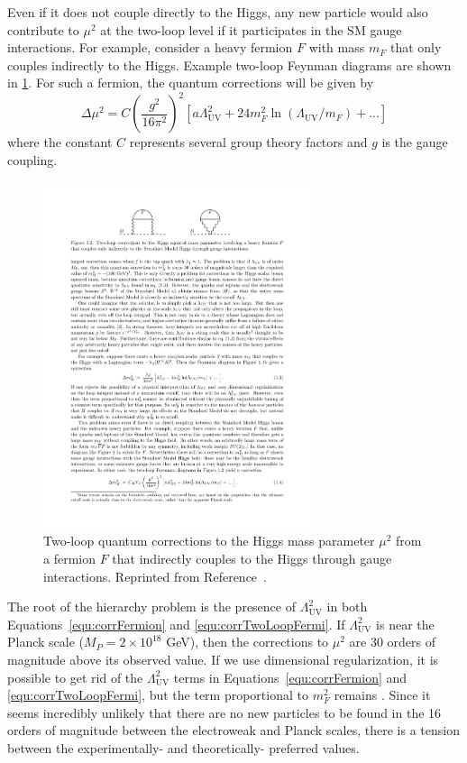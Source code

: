 Even if it does not couple directly to the Higgs, any new particle would also contribute to $\mu^2$ at the two-loop level if it participates in the SM gauge interactions. For example, consider a heavy fermion $F$ with mass $m_F$ that only couples indirectly to the Higgs. Example two-loop Feynman diagrams are shown in 
\ref{fig:hierarchyFermi}. For such a fermion, the quantum corrections will be given by
\begin{equation}
\Delta\mu^2 = C(\frac{g^2}{16\pi^2})^2 [a \Lambda^2_\mathrm{UV} + 24m_F^2 \ln(\Lambda_\mathrm{UV}/m_F) +...]
\label{equ:corrTwoLoopFermi}
\end{equation}
where the constant $C$ represents several group theory factors and $g$ is the gauge coupling. 

\begin{figure}[htbp]
    \centering
    \includegraphics[width=0.7\textwidth]{Figures/Theory/hierarchyLoopFermi.pdf}
    \caption{Two-loop quantum corrections to the Higgs mass parameter $\mu^2$ from a fermion $F$ that indirectly couples to the Higgs through gauge interactions.
    Reprinted from Reference~\cite{SUSYprimer}.}
    \label{fig:hierarchyFermi}
\end{figure}

The root of the hierarchy problem is the presence of $\Lambda^2_\mathrm{UV}$ in both Equations~\ref{equ:corrFermion} and \ref{equ:corrTwoLoopFermi}. If $\Lambda^2_\mathrm{UV}$ is near the Planck scale ($M_P = 2 \times 10^{18}$ GeV), then the corrections to $\mu^2$ are 30 orders of magnitude above its observed value. If we use dimensional regularization, it is possible to get rid of the $\Lambda^2_\mathrm{UV}$ terms in Equations~\ref{equ:corrFermion} and \ref{equ:corrTwoLoopFermi}, but the term proportional to $m_F^2$ remains \cite{SUSYprimer}. Since it seems incredibly unlikely that there are no new particles to be found in the 16 orders of magnitude between the electroweak and Planck scales, there is a tension between the experimentally- and theoretically- preferred values.


